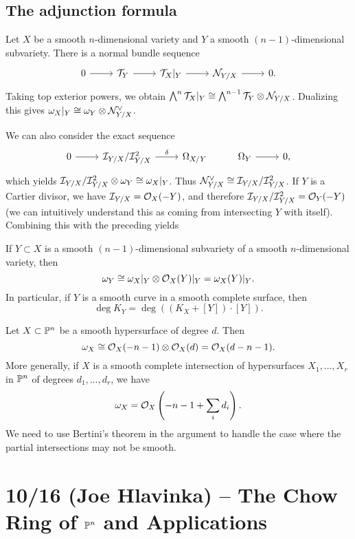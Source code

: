 \documentclass{article}
\begin{document}
\subsection{The adjunction formula}

Let $X$ be a smooth $n$-dimensional variety and $Y$ a smooth $(n-1)$-dimensional subvariety.
There is a normal bundle sequence
\[
	\begin{tikzcd}
		0 \rar & \Tc_Y \rar & \Tc_X|_Y \rar & \Nc_{Y/X} \rar & 0.
	\end{tikzcd}
\]
Taking top exterior powers, we obtain $\bigwedge^n \mathcal{T}_X|_Y \cong \bigwedge^{n-1} \mathcal{T}_Y \otimes \mathcal{N}_{Y/X}$.
Dualizing this gives $\omega_X|_Y \cong \omega_Y \otimes \mathcal{N}_{Y/X}^\vee$.

We can also consider the exact sequence
\[
	\begin{tikzcd}
		0 \rar & \Ic_{Y/X} / \Ic_{Y/X}^2 \rar["\delta"] & \Omega_{X/Y} & \Omega_Y \rar & 0,
	\end{tikzcd}
\]
which yields $\mathcal{I}_{Y/X} / \mathcal{I}_{Y/X}^2 \otimes \omega_Y \cong \omega_X|_Y$.
Thus $\mathcal{N}_{Y/X}^\vee \cong \mathcal{I}_{Y/X} / \mathcal{I}_{Y/X}^2$.
If $Y$ is a Cartier divisor, we have $\mathcal{I}_{Y/X} = \mathcal{O}_X(-Y)$, and therefore $\mathcal{I}_{Y/X} / \mathcal{I}_{Y/X}^2 = \mathcal{O}_Y(-Y)$ (we can intuitively understand this as coming from intersecting $Y$ with itself).
Combining this with the preceding yields

\begin{prop}
	If $Y \subset X$ is a smooth $(n-1)$-dimensional subvariety of a smooth $n$-dimensional variety, then
	\[
		\omega_Y \cong \omega_X|_Y \otimes \mathcal{O}_X(Y)|_Y = \omega_X(Y)|_Y.
	\]
	In particular, if $Y$ is a smooth curve in a smooth complete surface, then
	\[
		\deg K_Y = \deg ((K_X + [Y]) \cdot [Y]).
	\]
\end{prop}

\begin{ex}
	Let $X \subset \mathbb{P}^n$ be a smooth hypersurface of degree $d$.
	Then 
	\[
		\omega_X \cong \mathcal{O}_X(-n-1) \otimes \mathcal{O}_X(d) = \mathcal{O}_X(d-n-1).
	\]
	More generally, if $X$ is a smooth complete intersection of hypersurfaces $X_1, \dots, X_r$ in $\mathbb{P}^n$ of degrees $d_1, \dots, d_r$, we have
	\[
		\omega_X = \mathcal{O}_X\left(-n-1 + \sum_i d_i\right).
	\]
	We need to use Bertini's theorem in the argument to handle the case where the partial intersections may not be smooth.
\end{ex}

\section{10/16 (Joe Hlavinka) -- The Chow Ring of $\mathbb{P}^n$ and Applications}
\end{document}
